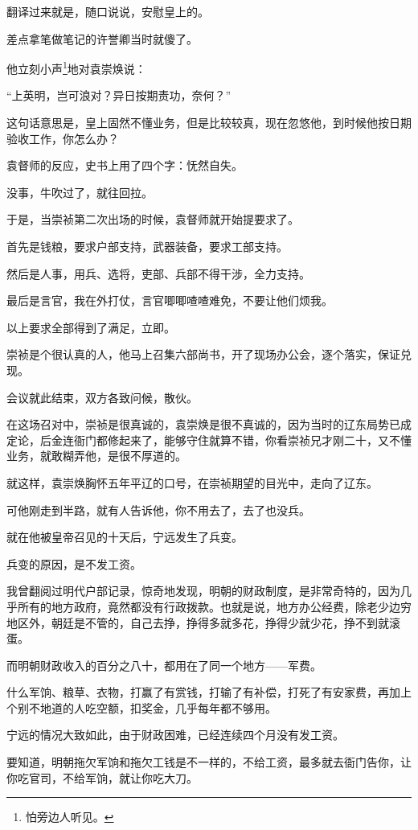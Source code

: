 \begin{multicols}{\theparacolNo}
翻译过来就是，随口说说，安慰皇上的。

差点拿笔做笔记的许誉卿当时就傻了。

他立刻小声\footnote{怕旁边人听见。}地对袁崇焕说：

“上英明，岂可浪对？异日按期责功，奈何？”

这句话意思是，皇上固然不懂业务，但是比较较真，现在忽悠他，到时候他按日期验收工作，你怎么办？

袁督师的反应，史书上用了四个字：怃然自失。

没事，牛吹过了，就往回拉。

于是，当崇祯第二次出场的时候，袁督师就开始提要求了。

首先是钱粮，要求户部支持，武器装备，要求工部支持。

然后是人事，用兵、选将，吏部、兵部不得干涉，全力支持。

最后是言官，我在外打仗，言官唧唧喳喳难免，不要让他们烦我。

以上要求全部得到了满足，立即。

崇祯是个很认真的人，他马上召集六部尚书，开了现场办公会，逐个落实，保证兑现。

会议就此结束，双方各致问候，散伙。

在这场召对中，崇祯是很真诚的，袁崇焕是很不真诚的，因为当时的辽东局势已成定论，后金连衙门都修起来了，能够守住就算不错，你看崇祯兄才刚二十，又不懂业务，就敢糊弄他，是很不厚道的。

就这样，袁崇焕胸怀五年平辽的口号，在崇祯期望的目光中，走向了辽东。

可他刚走到半路，就有人告诉他，你不用去了，去了也没兵。

就在他被皇帝召见的十天后，宁远发生了兵变。

兵变的原因，是不发工资。

我曾翻阅过明代户部记录，惊奇地发现，明朝的财政制度，是非常奇特的，因为几乎所有的地方政府，竟然都没有行政拨款。也就是说，地方办公经费，除老少边穷地区外，朝廷是不管的，自己去挣，挣得多就多花，挣得少就少花，挣不到就滚蛋。

而明朝财政收入的百分之八十，都用在了同一个地方——军费。

什么军饷、粮草、衣物，打赢了有赏钱，打输了有补偿，打死了有安家费，再加上个别不地道的人吃空额，扣奖金，几乎每年都不够用。

宁远的情况大致如此，由于财政困难，已经连续四个月没有发工资。

要知道，明朝拖欠军饷和拖欠工钱是不一样的，不给工资，最多就去衙门告你，让你吃官司，不给军饷，就让你吃大刀。


\end{multicols}
